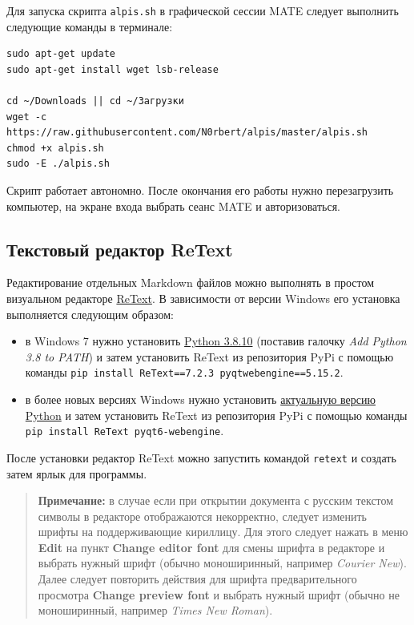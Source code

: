 \documentclass[
  a4paper,
]{book}
\providecommand{\tightlist}{%
  \setlength{\itemsep}{0pt}\setlength{\parskip}{0pt}}
\theoremstyle{definition}
\theoremstyle{definition}
\theoremstyle{definition}
\theoremstyle{definition}
\theoremstyle{remark}
\begin{document}
Для запуска скрипта \texttt{alpis.sh} в графической сессии MATE следует выполнить следующие команды в терминале:

\begin{verbatim}
sudo apt-get update
sudo apt-get install wget lsb-release

cd ~/Downloads || cd ~/Загрузки
wget -c https://raw.githubusercontent.com/N0rbert/alpis/master/alpis.sh
chmod +x alpis.sh
sudo -E ./alpis.sh
\end{verbatim}

Скрипт работает автономно. После окончания его работы нужно перезагрузить компьютер, на экране входа выбрать сеанс MATE и авторизоваться.

\hypertarget{software-retext}{%
\subsection{Текстовый редактор ReText}\label{software-retext}}

Редактирование отдельных Markdown файлов можно выполнять в простом визуальном редакторе \href{https://github.com/retext-project/retext}{ReText}. В зависимости от версии Windows его установка выполняется следующим образом:

\begin{itemize}
\tightlist
\item
  в Windows 7 нужно установить \href{https://www.python.org/ftp/python/3.8.10/python-3.8.10-amd64.exe}{Python 3.8.10} (поставив галочку \emph{Add Python 3.8 to PATH}) и затем установить ReText из репозитория PyPi с помощью команды \texttt{pip\ install\ ReText==7.2.3\ pyqtwebengine==5.15.2}.
\item
  в более новых версиях Windows нужно установить \href{https://www.python.org/downloads/windows/}{актуальную версию Python} и затем установить ReText из репозитория PyPi с помощью команды \texttt{pip\ install\ ReText\ pyqt6-webengine}.
\end{itemize}

После установки редактор ReText можно запустить командой \texttt{retext} и создать затем ярлык для программы.

\begin{quote}
\textbf{Примечание:} в случае если при открытии документа с русским текстом символы в редакторе отображаются некорректно, следует изменить шрифты на поддерживающие кириллицу.
Для этого следует нажать в меню \textbf{Edit} на пункт \textbf{Change editor font} для смены шрифта в редакторе и выбрать нужный шрифт (обычно моноширинный, например \emph{Courier New}).\\
Далее следует повторить действия для шрифта предварительного просмотра \textbf{Change preview font} и выбрать нужный шрифт (обычно не моноширинный, например \emph{Times New Roman}).
\end{quote}
\end{document}
